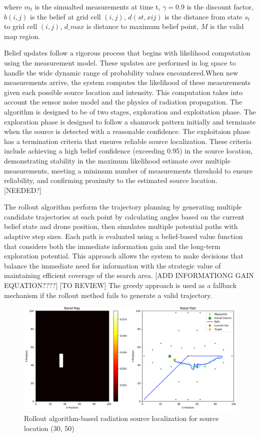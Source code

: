 \documentclass[../report.tex]{subfiles}
\begin{document}
    where $ m_t $ is the simualted measurements at time t, $\gamma = 0.9$ is the discount factor, $b(i,j)$ is the belief at grid cell $(i,j)$, $d(st,xij)$ is the distance from state $s_t$ to grid cell $(i,j)$,
    $d\_max$ is distance to maximum belief point, $M$ is the valid map region. 


    Belief updates follow a rigorous process that begins with likelihood computation using the measurement model. These updates are performed in log space to handle the wide dynamic range of 
    probability values encountered.When new measurements arrive, the system computes the likelihood of these measurements given each possible source location and intensity. This computation takes
     into account the sensor noise model and the physics of radiation propagation.  The algorithm is designed to be of two stages, exploration and exploitation phase. The exploration phase is 
     designed to follow a shamrock pattern initially 
    and terminate when the source is detected with a reasonable confidence. The exploitaion phase has a termination criteria that ensures reliable source localization. These criteria include 
    achieving a high belief confidence (exceeding 0.95) in the source location, demonstrating stability in the maximum likelihood estimate over multiple measurements, meeting a minimum number
    of measurements threshold to ensure reliability, and confirming proximity to the estimated source location. [NEEDED?]


    The rollout algorithm perform the trajectory planning by generating multiple candidate trajectories at each point by calculating angles based on the current belief state and drone position, 
    then simulates multiple potential paths with adaptive step sizes. Each path is evaluated using a belief-based value function that considers both the immediate information gain and the 
    long-term exploration potential. This approach allows the system to make decisions that balance the immediate need for information with the strategic value of maintaining efficient coverage of 
    the search area. [ADD INFORMATIONG GAIN EQUATION????] [TO REVIEW] The greedy approach is used as a fallback mechanism if the rollout method fails to generate a valid trajectory. 

    \begin{figure}[ht]
        \centering
        \includegraphics[width=\linewidth]{figures/rollout_algorithm.png}
        \caption{Rollout algorithm-based radiation source localization for source location (30, 50)}
        \label{fig:rollout_algorithm_plot}
    \end{figure}
\end{document}
